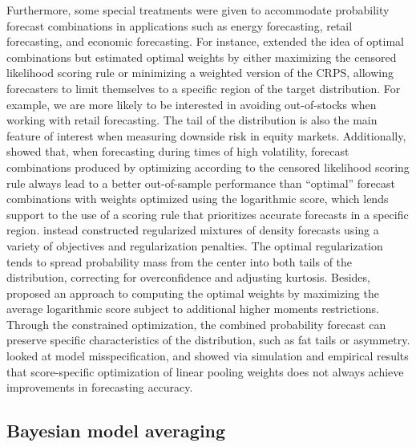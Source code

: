 \documentclass[a4paper,11pt]{article}
\begin{document}
Furthermore, some special treatments were given to accommodate probability forecast combinations in applications such as energy forecasting, retail forecasting, and economic forecasting. For instance, \citet{Opschoor2017-yu} extended the idea of optimal combinations but estimated optimal weights by either maximizing the censored likelihood scoring rule \citep{Diks2011-gj} or minimizing a weighted version of the CRPS, allowing forecasters to limit themselves to a specific region of the target distribution. For example, we are more likely to be interested in avoiding out-of-stocks when working with retail forecasting. The tail of the distribution is also the main feature of interest when measuring downside risk in equity markets. Additionally, \citet{Zischke2022-sv} showed that, when forecasting during times of high volatility, forecast combinations produced by optimizing according to the censored likelihood scoring rule always lead to a better out-of-sample performance than ``optimal'' forecast combinations with weights optimized using the logarithmic score, which lends support to the use of a scoring rule that prioritizes accurate forecasts in a specific region. \citet{Diebold2022-rm} instead constructed regularized mixtures of density forecasts using a variety of objectives and regularization penalties. The optimal regularization tends to spread probability mass from the center into both tails of the distribution, correcting for overconfidence and adjusting kurtosis. Besides, \citet{Pauwels2020-zl} proposed an approach to computing the optimal weights by maximizing the average logarithmic score subject to additional higher moments restrictions. Through the constrained optimization, the combined probability forecast can preserve specific characteristics of the distribution, such as fat tails or asymmetry. \citet{Martin2021-yi} looked at model misspecification, and showed via simulation and empirical results that score-specific optimization of linear pooling weights does not always achieve improvements in forecasting accuracy.

\subsection{Bayesian model averaging}
\label{sec:bma}
\end{document}
